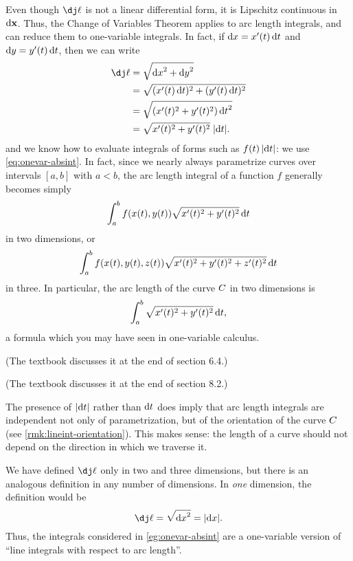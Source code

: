 Even though $\dl$ is not a linear differential form, it is Lipschitz continuous in $\dpx$.
Thus, the Change of Variables Theorem applies to arc length integrals, and can reduce them to one-variable integrals.
In fact, if $\dx = x'(t) \,\dt$ and $\dy = y'(t)\,\dt$, then we can write
\begin{align*}
  \dl &= \sqrt{\dx^2+\dy^2}\\
  &= \sqrt{(x'(t)\,\dt)^2 + (y'(t)\,\dt)^2}\\
  &= \sqrt{(x'(t)^2 + y'(t)^2) \,\dt^2}\\
  &= \sqrt{x'(t)^2 + y'(t)^2} \;|\dt|.
\end{align*}
and we know how to evaluate integrals of forms such as $f(t)\,|\dt|$: we use \cref{eq:onevar-absint}.
In fact, since we nearly always parametrize curves over intervals $[a,b]$ with $a<b$, the arc length integral of a function $f$ generally becomes simply
\[ \itint t a b {f(x(t),y(t)) \sqrt{x'(t)^2 + y'(t)^2}} \]
in two dimensions, or
\[ \itint t a b {f(x(t),y(t),z(t)) \sqrt{x'(t)^2 + y'(t)^2+z'(t)^2}} \]
in three.
In particular, the arc length of the curve $\curve$ in two dimensions is
\[ \itint t a b {\sqrt{x'(t)^2 + y'(t)^2}}, \]
a formula which you may have seen in one-variable calculus.
\begin{stewart}(The textbook discusses it at the end of section 6.4.)\end{stewart}
\begin{hugheshallett}(The textbook discusses it at the end of section 8.2.)\end{hugheshallett}


\begin{rmk}
  The presence of $|\dt|$ rather than $\dt$ does imply that arc length integrals are independent not only of parametrization, but of the orientation of the curve $\curve$ (see \cref{rmk:lineint-orientation}).
  This makes sense: the length of a curve should not depend on the direction in which we traverse it.
\end{rmk}

\begin{rmk}
  We have defined $\dl$ only in two and three dimensions, but there is an analogous definition in any number of dimensions.
  In \emph{one} dimension, the definition would be
  \[ \dl = \sqrt{\dx^2} = |\dx|. \]
  Thus, the integrals considered in \cref{eg:onevar-absint} are a one-variable version of ``line integrals with respect to arc length''.
\end{rmk}

